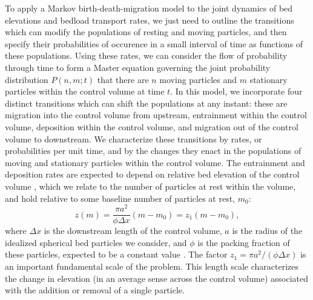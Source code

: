 \documentclass{article}
\newcommand\be{\begin{equation}} %
\newcommand\ee{\end{equation}}   %
\begin{document}


To apply a Markov birth-death-migration model to the joint dynamics of bed elevations and bedload transport rates, we just need to outline the transitions which can modify the populations of resting and moving particles, and then specify their probabilities of occurence in a small interval of time as functions of these populations. 
Using these rates, we can consider the flow of probability through time to form a Master equation \citep{Cox1965, Pielou1977, Gardiner1983, Gillespie1992, VanKampen1992} governing the joint probability distribution $P(n,m;t)$ that there are $n$ moving particles and $m$ stationary particles within the control volume at time $t$. 
In this model, we incorporate four distinct transitions which can shift the populations at any instant: these are migration into the control volume from upstream, entrainment within the control volume, deposition within the control volume, and migration out of the control volume to downstream.
We characterize these transitions by rates, or probabilities per unit time, and by the changes they enact in the populations of moving and stationary particles within the control volume. 
The entrainment and deposition rates are expected to depend on relative bed elevation of the control volume \citep{Yang1971, Sawai1987, Wong2007}, which we relate to the number of particles at rest within the volume, and hold relative to some baseline number of particles at rest, $m_0$: 
\be z(m) = \frac{\pi a^2}{\phi \Delta x}(m-m_0) = z_1(m-m_0), \label{eq:ele}\ee
where $\Delta x$ is the downstream length of the control volume, $a$ is the radius of the idealized spherical bed particles we consider, and $\phi$ is the packing fraction of these particles, expected to be a constant value \citep{Cundall1979}. 
The factor $z_1 = \pi a^2/(\phi \Delta x)$ is an important fundamental scale of the problem. This length scale characterizes the change in elevation (in an average sense across the control volume) associated with the addition or removal of a single particle.  
\end{document}
